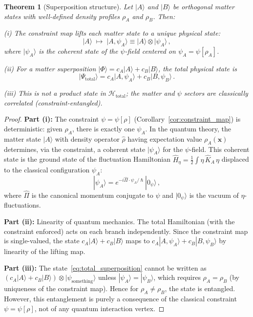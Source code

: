 \documentclass[12pt,a4paper]{article}
\newtheorem{theorem}{Theorem}
\theoremstyle{definition}
\theoremstyle{remark}
\newcommand{\hbar}{\hslash}
\newcommand{\Hilb}{\mathcal{H}}
\begin{document}
\begin{theorem}[Superposition structure]
\label{thm:superposition}
Let $|A\rangle$ and $|B\rangle$ be orthogonal matter states with well-defined
density profiles $\rho_A$ and $\rho_B$.  Then:

(i) The constraint map lifts each matter state to a unique physical state:
\begin{equation}
|A\rangle \;\longmapsto\; |A,\psi_A\rangle \equiv |A\rangle \otimes |\psi_A\rangle\,,
\end{equation}
where $|\psi_A\rangle$ is the coherent state of the $\psi$-field centered
on $\psi_A = \psi[\rho_A]$.

(ii) For a matter superposition
$|\Phi\rangle = c_A|A\rangle + c_B|B\rangle$, the total physical state is
\begin{equation}
\label{eq:total_superposition}
|\Psi_{\mathrm{total}}\rangle = c_A|A,\psi_A\rangle + c_B|B,\psi_B\rangle\,.
\end{equation}

(iii) This is \emph{not} a product state in $\Hilb_{\mathrm{total}}$;
the matter and $\psi$ sectors are \emph{classically correlated}
(constraint-entangled).
\end{theorem}

\begin{proof}
\textbf{Part (i):}
The constraint $\psi = \psi[\rho]$ (Corollary~\ref{cor:constraint_map}) is
deterministic: given $\rho_A$, there is exactly one $\psi_A$.  In the
quantum theory, the matter state $|A\rangle$ with density operator
$\hat{\rho}$ having expectation value $\rho_A(\mathbf{x})$ determines, via
the constraint, a coherent state $|\psi_A\rangle$ for the $\psi$-field.
This coherent state is the ground state of the fluctuation Hamiltonian
$\hat{H}_\eta = \frac{1}{2}\int \eta\,\hat{K}_A\,\eta$ displaced to the
classical configuration $\psi_A$:
\[
|\psi_A\rangle = e^{-i\hat{\Pi}\cdot\psi_A/\hbar}|0_\psi\rangle\,,
\]
where $\hat{\Pi}$ is the canonical momentum conjugate to $\psi$ and
$|0_\psi\rangle$ is the vacuum of $\eta$-fluctuations.

\textbf{Part (ii):}
Linearity of quantum mechanics.  The total Hamiltonian (with the constraint
enforced) acts on each branch independently.  Since the constraint map is
single-valued, the state $c_A|A\rangle + c_B|B\rangle$ maps to
$c_A|A,\psi_A\rangle + c_B|B,\psi_B\rangle$ by linearity of the lifting map.

\textbf{Part (iii):}
The state~\eqref{eq:total_superposition} cannot be written as
$(c_A|A\rangle + c_B|B\rangle)\otimes|\psi_{\text{something}}\rangle$ unless
$|\psi_A\rangle = |\psi_B\rangle$, which requires $\rho_A = \rho_B$
(by uniqueness of the constraint map).  Hence for $\rho_A \neq \rho_B$,
the state is entangled.  However, this entanglement is purely a consequence
of the classical constraint $\psi = \psi[\rho]$, not of any quantum
interaction vertex.
\end{proof}
\end{document}
